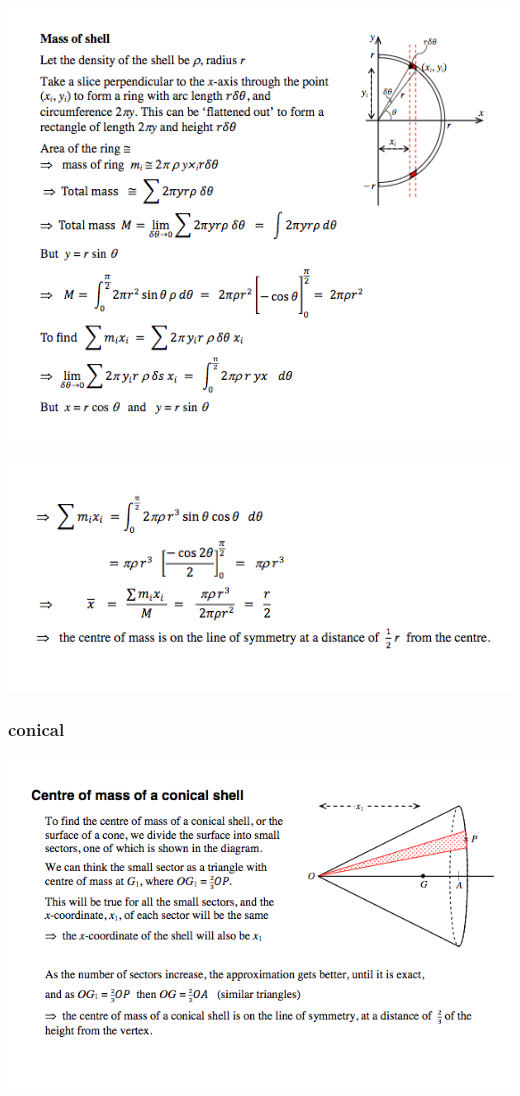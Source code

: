 \documentclass[a4paper]{article}
\begin{document}
\begin{center}
    \includegraphics[scale=0.5]{img_M/14_eg2_3}
\end{center}
\begin{center}
    \includegraphics[scale=0.5]{img_M/14_eg2_4}
\end{center}
\subsubsection{conical}
\begin{center}
    \includegraphics[scale=0.5]{img_M/14_intro3}
\end{center}
\end{document}

